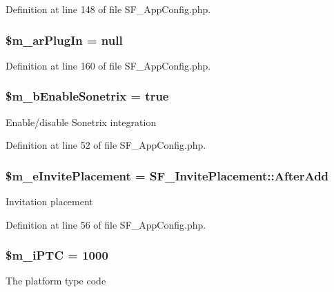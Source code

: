 Definition at line 148 of file SF\_\-AppConfig.php.

\hypertarget{classSF__AppConfig_a8913a39b1d58c42647d9d0b0f7ffe48c}{
\subsubsection[{\$m\_\-arPlugIn}]{\setlength{\rightskip}{0pt plus 5cm}\$m\_\-arPlugIn = null}}
\label{classSF__AppConfig_a8913a39b1d58c42647d9d0b0f7ffe48c}


Definition at line 160 of file SF\_\-AppConfig.php.

\hypertarget{classSF__AppConfig_a55534a049a693ced372dba4331e5e9bd}{
\subsubsection[{\$m\_\-bEnableSonetrix}]{\setlength{\rightskip}{0pt plus 5cm}\$m\_\-bEnableSonetrix = true}}
\label{classSF__AppConfig_a55534a049a693ced372dba4331e5e9bd}
Enable/disable Sonetrix integration 

Definition at line 52 of file SF\_\-AppConfig.php.

\hypertarget{classSF__AppConfig_a78a5b97e38e7a2bc9e36cca0a97a2cca}{
\subsubsection[{\$m\_\-eInvitePlacement}]{\setlength{\rightskip}{0pt plus 5cm}\$m\_\-eInvitePlacement = SF\_\-InvitePlacement::AfterAdd}}
\label{classSF__AppConfig_a78a5b97e38e7a2bc9e36cca0a97a2cca}
Invitation placement 

Definition at line 56 of file SF\_\-AppConfig.php.

\hypertarget{classSF__AppConfig_ab294fcb3988981bf2d504f3f3b07dd99}{
\subsubsection[{\$m\_\-iPTC}]{\setlength{\rightskip}{0pt plus 5cm}\$m\_\-iPTC = 1000}}
\label{classSF__AppConfig_ab294fcb3988981bf2d504f3f3b07dd99}
The platform type code 

